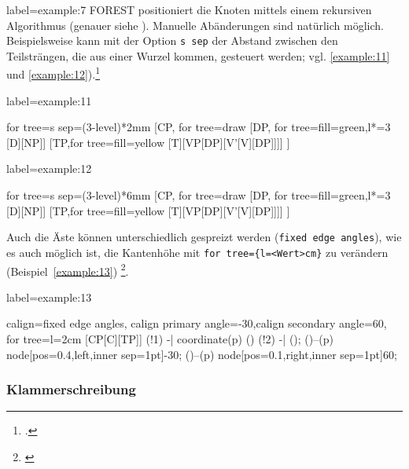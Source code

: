 \begin{lfgwcode}{label={example:7}}
FOREST positioniert die Knoten mittels einem rekursiven Algorithmus (genauer siehe 
\cite[Kap.\,2.4]{forest-doc}). Manuelle Abänderungen sind natürlich möglich. Beispielsweise
kann mit der Option 
\texttt{s sep} der Abstand zwischen den Teilsträngen, die aus einer Wurzel kommen, 
gesteuert werden; vgl. \ref{example:11} und \ref{example:12}).\footnote{\cite[Beispiel\,27]{forest-doc}.}


\begin{lfgwexample}{label={example:11}}
\begin{forest}
for tree={s sep=(3-level)*2mm}
[CP, for tree=draw
[DP, for tree={fill=green},l*=3
[D][NP]]
[TP,for tree={fill=yellow}
[T][VP[DP][V’[V][DP]]]]
]
\end{forest}
\end{lfgwexample}

\begin{lfgwexample}{label={example:12}}
\begin{forest}
for tree={s sep=(3-level)*6mm}
[CP, for tree=draw
[DP, for tree={fill=green},l*=3
[D][NP]]
[TP,for tree={fill=yellow}
[T][VP[DP][V’[V][DP]]]]
]
\end{forest}
\end{lfgwexample}

Auch die Äste können unterschiedlich gespreizt werden (\texttt{fixed edge angles}),
wie es auch möglich ist, die Kantenhöhe mit \verb|for tree={l=<Wert>cm}| zu verändern 
(Beispiel~\ref{example:13})
\footnote{\cite[Beispiel\,59]{forest-doc}}.

\begin{lfgwexample}{label={example:13}}
\begin{forest}
calign=fixed edge angles,
calign primary angle=-30,calign secondary angle=60,
for tree={l=2cm}
[CP[C][TP]]
\draw[dotted] (!1) -| coordinate(p) () (!2) -| ();
\path ()--(p) node[pos=0.4,left,inner sep=1pt]{-30};
\path ()--(p) node[pos=0.1,right,inner sep=1pt]{60};
\end{forest}
\end{lfgwexample}

\subsubsection{Klammerschreibung}


\end{lfgwcode}
